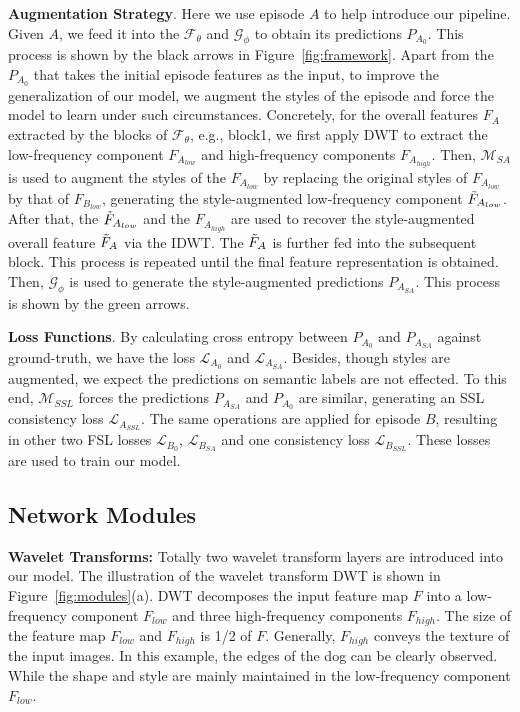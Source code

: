 \documentclass{article}
\begin{document}
\noindent\textbf{Augmentation Strategy}.
Here we use episode $A$ to help introduce our pipeline. Given $A$, we feed it into the $\mathcal{F_\theta}$ and $\mathcal{G_\phi}$ to obtain its predictions $P_{A_{0}}$. This process is shown by the black arrows in Figure~\ref{fig:framework}. Apart from the $P_{A_{0}}$ that takes the initial episode features as the input, to improve the generalization of our model, we augment the styles of the episode and force the model to learn under such circumstances. Concretely, for the overall features $F_{A}$ extracted by the blocks of $\mathcal{F_\theta}$, e.g., block1, we first apply DWT to extract the low-frequency component $F_{A_{low}}$ and high-frequency components $F_{A_{high}}$. Then, $\mathcal{M}_{SA}$ is used to augment the styles of the $F_{A_{low}}$ by replacing the original styles of $F_{A_{low}}$ by that of $F_{B_{low}}$, generating the style-augmented low-frequency component $\Tilde{F}_{A_{low}}$. After that, the $\Tilde{F}_{A_{low}}$ and the $F_{A_{high}}$ are used to recover the style-augmented overall feature $\Tilde{F}_A$ via the IDWT. The $\Tilde{F}_A$ is further fed into the subsequent block. This process is repeated until the final feature representation is obtained. Then, $\mathcal{G_\phi}$ is used to generate the style-augmented predictions $P_{A_{SA}}$. This process is shown by the green arrows. 


\noindent\textbf{Loss Functions}.
By calculating  cross entropy  between  $P_{A_{0}}$ and $P_{A_{SA}}$ against  ground-truth, we have the loss $\mathcal{L}_{A_{0}}$ and $\mathcal{L}_{A_{SA}}$.
Besides, though styles are augmented, we expect the predictions on  semantic labels are not effected. To this end, $\mathcal{M}_{SSL}$ forces the predictions $P_{A_{SA}}$ and $P_{A_{0}}$ are similar, generating an SSL consistency loss $\mathcal{L}_{A_{SSL}}$. The same operations are applied for episode $B$, resulting in other two FSL losses $\mathcal{L}_{B_{0}}$,  $\mathcal{L}_{B_{SA}}$ and one consistency loss $\mathcal{L}_{B_{SSL}}$. These losses are used to train our model. 



\subsection{Network Modules}
\noindent\textbf{Wavelet Transforms:} Totally two wavelet transform layers are introduced into our model. The illustration of the wavelet transform DWT is shown in Figure~\ref{fig:modules}(a). DWT decomposes the input feature map $F$ into a low-frequency component $F_{low}$ and three high-frequency components $F_{high}$. The size of the feature map $F_{low}$ and $F_{high}$ is 1/2 of $F$. Generally, $F_{high}$ conveys the texture of the input images. In this example, the edges of the dog can be clearly observed. 
While the shape and style are mainly maintained in the low-frequency component $F_{low}$. 
\end{document}
